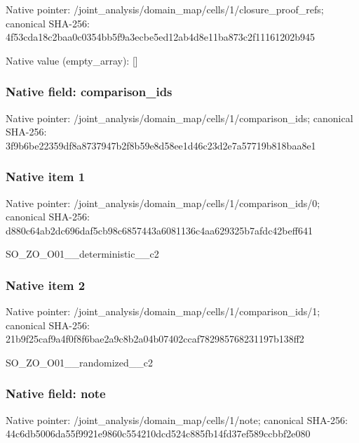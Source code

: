 \documentclass[10pt,a4paper]{article}
\begin{document}
Native pointer: /joint\_analysis/domain\_m\allowbreak{}ap/cells/1/closure\_proof\allowbreak{}\_refs; canonical SHA-256: 4f53cda18c2baa0c0354bb5f\allowbreak{}9a3ecbe5ed12ab4d8e11ba87\allowbreak{}3c2f11161202b945



Native value (empty\_array): []



\subsubsection{Native field: comparison\_ids}


Native pointer: /joint\_analysis/domain\_m\allowbreak{}ap/cells/1/comparison\_id\allowbreak{}s; canonical SHA-256: 3f9b6be22359df8a8737947b\allowbreak{}2f8b59e8d58ee1d46c23d2e7\allowbreak{}a57719b818baa8e1



\subsubsection{Native item 1}


Native pointer: /joint\_analysis/domain\_m\allowbreak{}ap/cells/1/comparison\_id\allowbreak{}s/0; canonical SHA-256: d880c64ab2dc696daf5cb98c\allowbreak{}6857443a6081136c4aa62932\allowbreak{}5b7afdc42beff641


SO\_ZO\_O01\_\_deterministic\_\_c2


\subsubsection{Native item 2}


Native pointer: /joint\_analysis/domain\_m\allowbreak{}ap/cells/1/comparison\_id\allowbreak{}s/1; canonical SHA-256: 21b9f25caf9a4f0f8f6bae2a\allowbreak{}9c8b2a04b07402ccaf782985\allowbreak{}768231197b138ff2


SO\_ZO\_O01\_\_randomized\_\_c2


\subsubsection{Native field: note}


Native pointer: /joint\_analysis/domain\_map/cells/1/note; canonical SHA-256: 44c6db5006da55f9921e9860\allowbreak{}c554210dcd524c885fb14fd3\allowbreak{}7ef589ccbbf2e080
\end{document}
